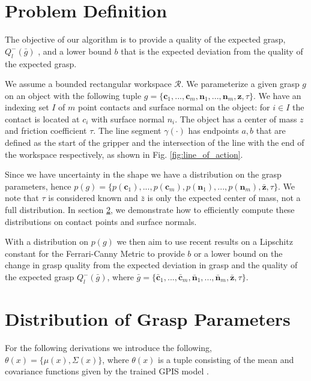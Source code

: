 \documentclass[letterpaper, 10 pt, conference]{ieeeconf}  %
\begin{document}
\section{Problem Definition}

The objective of our algorithm is to provide a quality of the expected grasp, $Q_l^-(\bar{g})$ \cite{ferrari1992}, and a lower bound $b$ that is the expected deviation from the quality of the expected grasp. 

We assume a bounded rectangular workspace $\mathcal{R}$.
We parameterize a given grasp $g$ on an object with the following tuple $g = \lbrace \textbf{c}_1,...,\textbf{c}_m,\textbf{n}_1,...,\textbf{n}_m,\textbf{z},\tau\rbrace$.
We have an indexing set $I$ of $m$ point contacts and surface normal on the object: for $i \in I$ the contact is located at $c_i$ with surface normal $n_i$.
The object has a center of mass $z$ and friction coefficient $\tau$.
The line segment $\gamma(\cdot)$ has endpoints $a,b$ that are defined as the start of the gripper and the intersection of the line with the end of the workspace respectively, as shown in Fig. 
 \ref{fig:line_of_action}.


Since we have uncertainty in the shape we have a distribution on the grasp parameters, hence $p(g) = \lbrace p(\textbf{c}_1),...,p(\textbf{c}_m),p(\textbf{n}_1),...,p(\textbf{n}_m),\bar{\textbf{z}},\tau \rbrace$.
We note that $\tau$ is considered known and $\bar{z}$ is only the expected center of mass, not a full distribution. In section \ref{sec:distgrasp}, we demonstrate how to efficiently compute these distributions on contact points and surface normals. 

With a distribution on $p(g)$ we then aim to use recent results on a Lipschitz constant for the Ferrari-Canny Metric \cite{pokorny2013classical} to provide $b$ or a lower bound on the change in grasp quality from the expected deviation in grasp and the quality of the expected grasp $Q_l^-(\bar{g})$, where $\bar{g} = \lbrace \bar{\textbf{c}}_1,...,\bar{\textbf{c}}_m,\bar{\textbf{n}}_1,...,\bar{\textbf{n}}_m,\bar{\textbf{z}},\tau \rbrace$.



\section{Distribution of Grasp Parameters}
\label{sec:distgrasp}

 For the following derivations we introduce the following,
 $\theta(x) = \lbrace \mu(x),\Sigma(x) \rbrace$, where $\theta(x)$ is a tuple consisting of the mean and covariance functions given by the trained GPIS model \cite{rasmussen2006} . 
 
\end{document}
